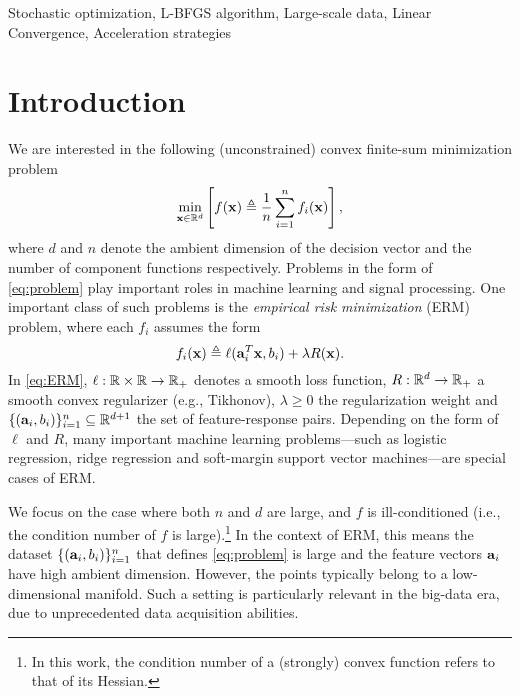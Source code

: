 \documentclass[10pt,twocolumn,journal]{IEEEtran}
\begin{document}
 
\begin{IEEEkeywords}
Stochastic optimization, L-BFGS algorithm, Large-scale data, Linear Convergence, Acceleration strategies
\end{IEEEkeywords}


\section{Introduction}\label{sec:intro}

We are interested in the following (unconstrained) convex finite-sum minimization problem 
\begin{equation}
\min_{\mathbf{x}\in\mathbb{R}^d} \left[f(\mathbf{x})\triangleq\frac{1}{n}\sum_{i=1}^n f_i(\mathbf{x})\right], \label{eq:problem}
\end{equation}
where $d$ and $n$ denote the ambient dimension of the decision vector and the number of component functions respectively.
Problems in the form of \eqref{eq:problem} play important roles in machine learning and signal processing. %
One important class of such problems is the {\em empirical risk minimization} (ERM) problem, where each $f_i$ assumes the form 
\begin{equation}
f_i(\mathbf{x}) \triangleq \ell(\mathbf{a}_i^T\mathbf{x},b_i)+\lambda R(\mathbf{x}). \label{eq:ERM}
\end{equation}
In \eqref{eq:ERM}, $\ell:\mathbb{R}\times\mathbb{R}\to\mathbb{R}_+$ denotes a smooth loss function, $R:\mathbb{R}^d\to\mathbb{R}_+$ a smooth convex regularizer (e.g., Tikhonov), $\lambda\ge 0$ the regularization weight and $\{(\mathbf{a}_i,b_i)\}_{i=1}^n\subseteq \mathbb{R}^{d+1}$ the set of feature-response pairs. Depending on the form of $\ell$ and $R$, many important machine learning problems---such as logistic regression, ridge regression and soft-margin support vector machines---are special cases of ERM.

We focus on the case where both $n$ and $d$ are large, and $f$ is ill-conditioned (i.e., the condition number of $f$ is large).\footnote{In this work, the condition number of a (strongly) convex function refers to that of its Hessian.} In the context of ERM, this means the  {dataset  $\{(\mathbf{a}_i,b_i)\}_{i=1}^n$ that defines \eqref{eq:problem} is large and the feature vectors $\mathbf{a}_i$ have high ambient dimension. However, the points} typically belong to a low-dimensional manifold. Such a setting is particularly relevant in the big-data era, due to unprecedented data acquisition abilities. 
\end{document}

